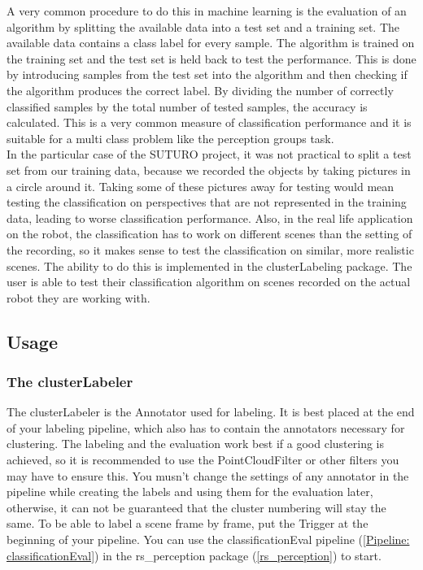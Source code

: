 \documentclass[main.tex]{subfiles}
\begin{document}
A very common procedure to do this in machine learning is the evaluation of an algorithm by splitting the available data into a test set and a training set. The available data contains a class label for every sample. The algorithm is trained on the training set and the test set is held back to test the performance. This is done by introducing samples from the test set into the algorithm and then checking if the algorithm produces the correct label. By dividing the number of correctly classified samples by the total number of tested samples, the accuracy is calculated. This is a very common measure of classification performance and it is suitable for a multi class problem like the perception groups task.\\

In the particular case of the SUTURO project, it was not practical to split a test set from our training data, because we recorded the objects by taking pictures in a circle around it. Taking some of these pictures away for testing would mean testing the classification on perspectives that are not represented in the training data, leading to worse classification performance. Also, in the real life application on the robot, the classification has to work on different scenes than the setting of the recording, so it makes sense to test the classification on similar, more realistic scenes. The ability to do this is implemented in the clusterLabeling package. The user is able to test their classification algorithm on scenes recorded on the actual robot they are working with.  

\subsection{Usage}\label{clusterLabeling Usage}

\subsubsection{The clusterLabeler}\label{clusterLabeler}
The clusterLabeler is the Annotator used for labeling. It is best placed at the end of your labeling pipeline, which also has to contain the annotators necessary for clustering. The labeling and the evaluation work best if a good clustering is achieved, so it is recommended to use the PointCloudFilter or other filters you may have to ensure this. You musn't change the settings of any annotator in the pipeline while creating the labels and using them for the evaluation later, otherwise, it can not be guaranteed that the cluster numbering will stay the same. To be able to label a scene frame by frame, put the Trigger at the beginning of your pipeline. You can use the classificationEval pipeline (\ref{Pipeline: classificationEval}) in the rs\_perception package (\ref{rs_perception}) to start.\\
\end{document}

